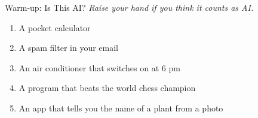 \begin{frame}{Warm-up: Is This AI?}
    \textit{Raise your hand if you think it counts as AI.}

    \vspace{0.8em}
    \begin{enumerate}
        \setlength\itemsep{0.7em}
        \item A pocket calculator
        \item A spam filter in your email
        \item An air conditioner that switches on at 6 pm
        \item A program that beats the world chess champion
        \item An app that tells you the name of a plant from a photo
    \end{enumerate}

    \pause
    \vspace{0.8em}
\end{frame}

